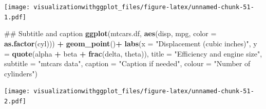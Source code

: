 \documentclass[]{krantz}
\makeatletter
\newenvironment{Shaded}{\begin{snugshade}}{\end{snugshade}}
\newcommand{\KeywordTok}[1]{\textcolor[rgb]{0.13,0.29,0.53}{\textbf{#1}}}
\newcommand{\DataTypeTok}[1]{\textcolor[rgb]{0.13,0.29,0.53}{#1}}
\newcommand{\StringTok}[1]{\textcolor[rgb]{0.31,0.60,0.02}{#1}}
\newcommand{\CommentTok}[1]{\textcolor[rgb]{0.56,0.35,0.01}{\textit{#1}}}
\newcommand{\OperatorTok}[1]{\textcolor[rgb]{0.81,0.36,0.00}{\textbf{#1}}}
\newcommand{\NormalTok}[1]{#1}
\newenvironment{kframe}{%
\medskip{}
\setlength{\fboxsep}{.8em}
 \def\at@end@of@kframe{}%
 \ifinner\ifhmode%
  \def\at@end@of@kframe{\end{minipage}}%
  \begin{minipage}{\columnwidth}%
 \fi\fi%
 \def\FrameCommand##1{\hskip\@totalleftmargin \hskip-\fboxsep
 \colorbox{shadecolor}{##1}\hskip-\fboxsep
     \hskip-\linewidth \hskip-\@totalleftmargin \hskip\columnwidth}%
 \MakeFramed {\advance\hsize-\width
   \@totalleftmargin\z@ \linewidth\hsize
   \@setminipage}}%
 {\par\unskip\endMakeFramed%
 \at@end@of@kframe}
\renewenvironment{Shaded}{\begin{kframe}}{\end{kframe}}
\theoremstyle{definition}
\theoremstyle{definition}
\theoremstyle{definition}
\theoremstyle{remark}
\makeatother
\begin{document}
\begin{Shaded}
\end{Shaded}

\texttt{[image: visualizationwithggplot\_files/figure-latex/unnamed-chunk-51-1.pdf]}

\begin{Shaded}
\begin{Highlighting}[]
\NormalTok{## Subtitle and caption}
\KeywordTok{ggplot}\NormalTok{(mtcars.df, }\KeywordTok{aes}\NormalTok{(disp,  mpg, }\DataTypeTok{color =} \KeywordTok{as.factor}\NormalTok{(cyl))) }\OperatorTok{+}\StringTok{ }
\StringTok{  }\KeywordTok{geom_point}\NormalTok{()}\OperatorTok{+}
\StringTok{  }\KeywordTok{labs}\NormalTok{(}\DataTypeTok{x =} \StringTok{"Displacement (cubic inches)"}\NormalTok{, }\DataTypeTok{y =} \KeywordTok{quote}\NormalTok{(alpha }\OperatorTok{+}\StringTok{ }\NormalTok{beta }\OperatorTok{+}\StringTok{ }\KeywordTok{frac}\NormalTok{(delta, theta)), }
       \DataTypeTok{title =} \StringTok{"Efficiency and engine size"}\NormalTok{, }\DataTypeTok{subtitle =} \StringTok{"mtcars data"}\NormalTok{,}
       \DataTypeTok{caption =} \StringTok{"Caption if needed"}\NormalTok{,}
       \DataTypeTok{colour =} \StringTok{"Number of cylinders"}\NormalTok{)}
\end{Highlighting}
\end{Shaded}

\texttt{[image: visualizationwithggplot\_files/figure-latex/unnamed-chunk-51-2.pdf]}
\end{document}
